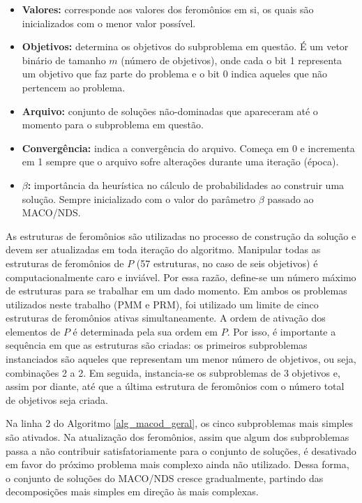 \begin{itemize}
	\item \textbf{Valores:} corresponde aos valores dos feromônios em si, os quais são inicializados com o menor valor possível.
	\item \textbf{Objetivos:} determina os objetivos do subproblema em questão. É um vetor binário de tamanho $m$ (número de objetivos), onde cada o bit 1 representa um objetivo que faz parte do problema e o bit 0 indica aqueles que não pertencem ao problema.
	\item \textbf{Arquivo:} conjunto de soluções não-dominadas que apareceram até o momento para o subproblema em questão.
	\item \textbf{Convergência:} indica a convergência do arquivo. Começa em 0 e incrementa em 1 sempre que o arquivo sofre alterações durante uma iteração (época).
	\item \textbf{$\beta$:} importância da heurística no cálculo de probabilidades ao construir uma solução. Sempre inicializado com o valor do parâmetro $\beta$ passado ao MACO/NDS.
\end{itemize}

As estruturas de feromônios são utilizadas no processo de construção da solução e devem ser atualizadas em toda iteração do algoritmo. Manipular todas as estruturas de feromônios de $P$ (57 estruturas, no caso de seis objetivos) é computacionalmente caro e inviável. Por essa razão, define-se um número máximo de estruturas para se trabalhar em um dado momento. Em ambos os problemas utilizados neste trabalho (PMM e PRM), foi utilizado um limite de cinco estruturas de feromônios ativas simultaneamente. A ordem de ativação dos elementos de $P$ é determinada pela sua ordem em $P$. Por isso, é importante a sequência em que as estruturas são criadas: os primeiros subproblemas instanciados são aqueles que representam um menor número de  objetivos, ou seja, combinações 2 a 2. Em seguida, instancia-se os subproblemas de 3 objetivos e, assim por diante, até que a última estrutura de feromônios com o número total de objetivos seja criada.

Na linha 2 do Algoritmo \ref{alg_macod_geral}, os cinco subproblemas mais simples são ativados. Na atualização dos feromônios, assim que algum dos subproblemas passa a não contribuir satisfatoriamente para o conjunto de soluções, é desativado em favor do próximo problema mais complexo ainda não utilizado. Dessa forma, o conjunto de soluções do MACO/NDS cresce gradualmente, partindo das decomposições mais simples em direção às mais complexas.

